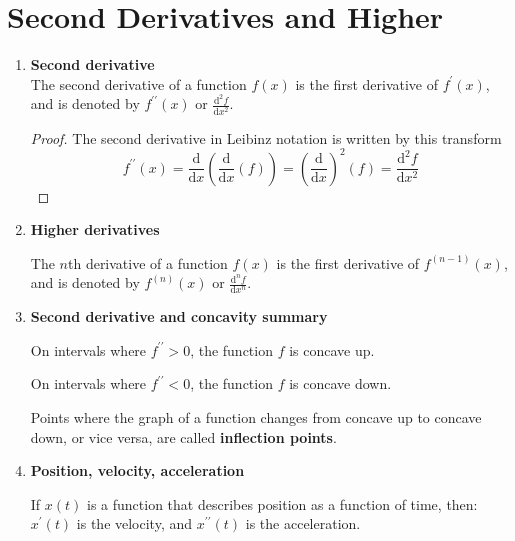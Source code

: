 \section{Second Derivatives and Higher}
\begin{enumerate}
    \item \textbf{Second derivative}\\
        \indent The second derivative of a function $f(x)$ is the first derivative of $f^\prime(x)$, and is denoted by $f^{\prime\prime}(x)$ or $\frac{\mathrm{d}^2 f}{\mathrm{d}x^2}$.
        \begin{proof}
            The second derivative in Leibinz notation is written by this transform
            \[
            f^{\prime\prime}(x)
            =\frac{\mathrm{d}}{\mathrm{d}x}\left(\frac{\mathrm{d}}{\mathrm{d}x}(f)\right)
            =\left(\frac{\mathrm{d}}{\mathrm{d}x}\right)^2(f)
            =\frac{\mathrm{d}^2 f}{\mathrm{d}x^2}
            \]
        \end{proof}
    \item \textbf{Higher derivatives}

        The $n$th derivative of a function $f(x)$ is the first derivative of $f^{(n-1)}(x)$, and is denoted by $f^{(n)}(x)$ or $\frac{\mathrm{d}^n f}{\mathrm{d} x^n}$.
    \item \textbf{Second derivative and concavity summary}
        
        On intervals where $f^{\prime\prime}>0$, the function $f$ is concave up.
        \begin{figure}[H]
            \centering
        \end{figure}

        On intervals where $f^{\prime\prime}<0$, the function $f$ is concave down.
        \begin{figure}[H]
            \centering
        \end{figure}

        Points where the graph of a function changes from concave up to concave down, or vice versa, are called \textbf{inflection points}.
    \item \textbf{Position, velocity, acceleration}

        If $x(t)$ is a function that describes position as a function of time, then:
        $x^\prime (t)$ is the velocity, and $x^{\prime\prime} (t)$ is the acceleration.
\end{enumerate}

